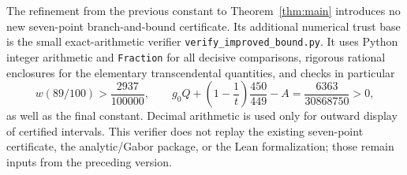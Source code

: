 The refinement from the previous constant to Theorem~\ref{thm:main} introduces
no new seven-point branch-and-bound certificate.  Its additional numerical
trust base is the small exact-arithmetic verifier
\texttt{verify\_improved\_bound.py}.  It uses Python integer arithmetic and
\texttt{Fraction} for all decisive comparisons, rigorous rational enclosures
for the elementary transcendental quantities, and checks in particular
\[
 w(89/100)>\frac{2937}{100000},
 \qquad
 g_0Q+\left(1-\frac1t\right)\frac{450}{449}-A
 =\frac{6363}{30868750}>0,
\]
as well as the final constant.  Decimal arithmetic is used only for outward
display of certified intervals.  This verifier does not replay the existing
seven-point certificate, the analytic/Gabor package, or the Lean
formalization; those remain inputs from the preceding version.
